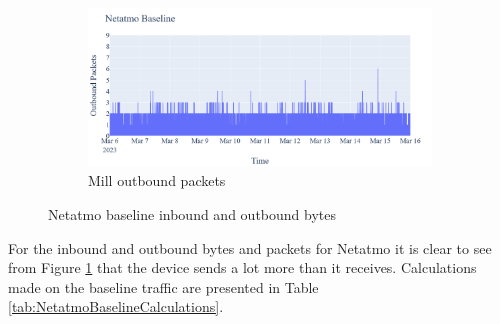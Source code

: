 \begin{figure}[H]
\begin{subfigure}[b]{0.4\textwidth}
    \end{subfigure}
    \begin{subfigure}[b]{0.4\textwidth}
        \includegraphics[width=\textwidth]{figures/Netatmo_Baseline_OutboundPackets.png}
        \caption{Mill outbound packets}
    \end{subfigure}
    \caption{Netatmo baseline inbound and outbound bytes}
    \label{Fig:NetatmoBaselineOutandInboundTraffic}
 \end{figure}

For the inbound and outbound bytes and packets for Netatmo it is clear to see from Figure \ref{Fig:NetatmoBaselineOutandInboundTraffic} that the device sends a lot more than it receives. Calculations made on the baseline traffic are presented in Table \ref{tab:NetatmoBaselineCalculations}. 


